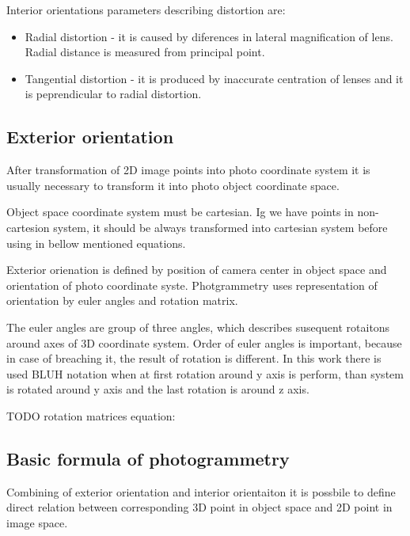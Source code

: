 \documentclass[a4paper,12pt]{report}
\begin{document}
Interior orientations parameters describing distortion are:
\begin{itemize}
  \item Radial distortion - it is caused by diferences in lateral magnification of lens. Radial distance is measured from principal point.
  \item Tangential distortion - it is produced by inaccurate centration of lenses and it is peprendicular to radial distortion.
\end{itemize}


\subsection{Exterior orientation}

After transformation of 2D image points into photo coordinate system it is usually necessary to transform it into photo object coordinate space.


Object space coordinate system must be cartesian. Ig we have points in non-cartesion system, it should be always transformed into cartesian 
system before using in bellow mentioned equations.


Exterior orienation is defined by position of camera center in object space and orientation of photo coordinate syste.
Photgrammetry uses representation of orientation by euler angles and rotation matrix.

The euler angles are group of three angles, which describes susequent rotaitons
 around axes of 3D coordinate system. 
 Order of euler angles is important, because in case of breaching it, the result of rotation is different. 
 In this work there is used BLUH notation when at first rotation around y axis is 
 perform, than system is rotated around y axis and the last rotation is around z axis.
 
 TODO rotation matrices equation:
 
\subsection{Basic formula of photogrammetry}

Combining of exterior orientation and interior orientaiton it is possbile to define 
direct relation between corresponding 3D point in object space and 2D point
in image space.
\end{document}
